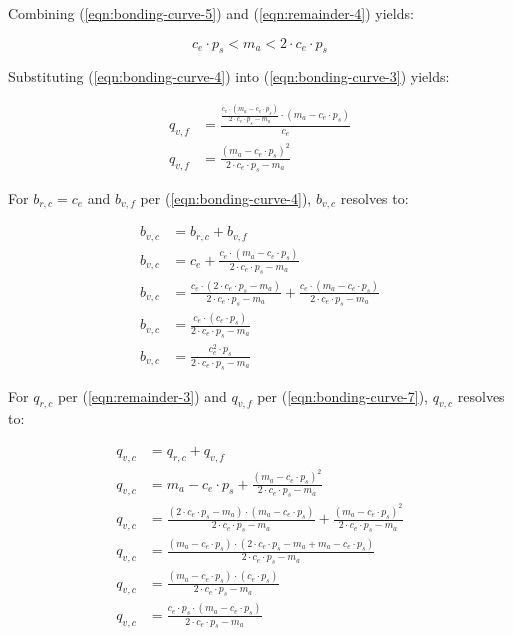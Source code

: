 \documentclass[table, twocolumn]{article}
\begin{document}
Combining (\ref{eqn:bonding-curve-5}) and (\ref{eqn:remainder-4}) yields:

\begin{equation} \label{eqn:bonding-curve-6}
  c_e \cdot p_s < m_a < 2 \cdot c_e \cdot p_s
\end{equation}

Substituting (\ref{eqn:bonding-curve-4}) into (\ref{eqn:bonding-curve-3}) yields:

\begin{align} \label{eqn:bonding-curve-7}
  q_{v, f} & =
  \frac{\frac{c_e \cdot (m_a - c_e \cdot p_s)}{2 \cdot c_e \cdot p_s - m_a}
  \cdot (m_a - c_e \cdot p_s)}{c_e} \nonumber                                \\
  q_{v, f} & = \frac{(m_a - c_e \cdot p_s) ^ 2}{2 \cdot c_e \cdot p_s - m_a}
\end{align}

For $b_{r, c} = c_e$ and $b_{v, f}$ per (\ref{eqn:bonding-curve-4}), $b_{v, c}$ resolves
to:

\begin{align} \label{eqn:bonding-curve-8}
  b_{v, c} & = b_{r, c} + b_{v, f} \nonumber                                          \\
  b_{v, c} & =
  c_e + \frac{c_e \cdot (m_a - c_e \cdot p_s)}{2 \cdot c_e \cdot p_s - m_a} \nonumber \\
  b_{v, c} & =
  \frac{c_e \cdot (2 \cdot c_e \cdot p_s - m_a)}{2 \cdot c_e \cdot p_s - m_a} +
  \frac{c_e \cdot (m_a - c_e \cdot p_s)}{2 \cdot c_e \cdot p_s - m_a} \nonumber       \\
  b_{v, c} & =
  \frac{c_e \cdot (c_e \cdot p_s)}{2 \cdot c_e \cdot p_s - m_a} \nonumber             \\
  b_{v, c} & = \frac{c_e ^ 2 \cdot p_s}{2 \cdot c_e \cdot p_s - m_a}
\end{align}

For $q_{r, c}$ per (\ref{eqn:remainder-3}) and $q_{v, f}$ per
(\ref{eqn:bonding-curve-7}), $q_{v, c}$ resolves to:

\begin{align}
  q_{v, c} & = q_{r, c} + q_{v, f} \nonumber                                   \\
  q_{v, c} & = m_a - c_e \cdot p_s +
  \frac{(m_a - c_e \cdot p_s) ^ 2}{2 \cdot c_e \cdot p_s - m_a} \nonumber      \\
  q_{v, c} & = \frac{(2 \cdot c_e \cdot p_s - m_a) \cdot(m_a - c_e \cdot p_s)}
  {2 \cdot c_e \cdot p_s - m_a} +
  \frac{(m_a - c_e \cdot p_s) ^ 2}{2 \cdot c_e \cdot p_s - m_a} \nonumber      \\
  q_{v, c} & =
  \frac{(m_a - c_e \cdot p_s) \cdot (2 \cdot c_e \cdot p_s - m_a + m_a - c_e \cdot p_s)}
  {2 \cdot c_e \cdot p_s - m_a} \nonumber                                      \\
  q_{v, c} & = \frac{(m_a - c_e \cdot p_s) \cdot (c_e \cdot p_s)}
  {2 \cdot c_e \cdot p_s - m_a} \nonumber                                      \\
  q_{v, c} & = \frac{c_e \cdot p_s \cdot(m_a - c_e \cdot p_s)}
  {2 \cdot c_e \cdot p_s - m_a}
\end{align}
\end{document}
